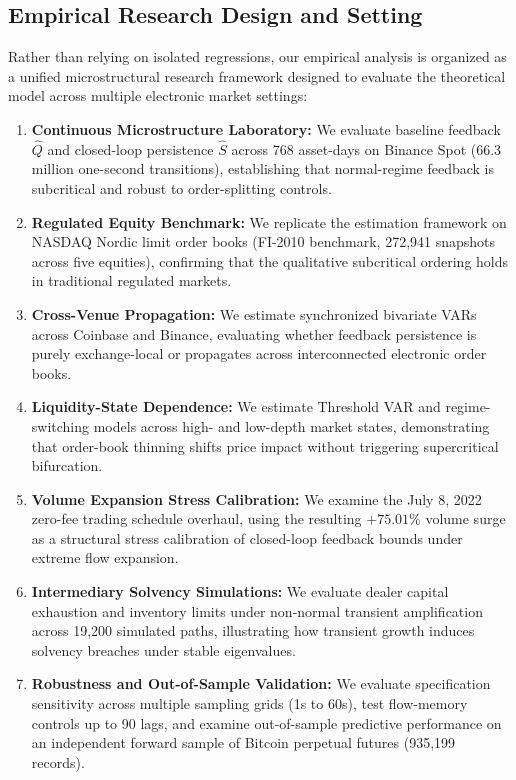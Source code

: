 \documentclass[12pt]{article}
\theoremstyle{definition}
\theoremstyle{remark}
\begin{document}
\subsection{Empirical Research Design and Setting}
Rather than relying on isolated regressions, our empirical analysis is organized as a unified microstructural research framework designed to evaluate the theoretical model across multiple electronic market settings:
\begin{enumerate}[label=\arabic*.]
    \item \textbf{Continuous Microstructure Laboratory:} We evaluate baseline feedback $\hat{Q}$ and closed-loop persistence $\hat{S}$ across 768 asset-days on Binance Spot (66.3 million one-second transitions), establishing that normal-regime feedback is subcritical and robust to order-splitting controls.
    \item \textbf{Regulated Equity Benchmark:} We replicate the estimation framework on NASDAQ Nordic limit order books (FI-2010 benchmark, 272,941 snapshots across five equities), confirming that the qualitative subcritical ordering holds in traditional regulated markets.
    \item \textbf{Cross-Venue Propagation:} We estimate synchronized bivariate VARs across Coinbase and Binance, evaluating whether feedback persistence is purely exchange-local or propagates across interconnected electronic order books.
    \item \textbf{Liquidity-State Dependence:} We estimate Threshold VAR and regime-switching models across high- and low-depth market states, demonstrating that order-book thinning shifts price impact without triggering supercritical bifurcation.
    \item \textbf{Volume Expansion Stress Calibration:} We examine the July 8, 2022 zero-fee trading schedule overhaul, using the resulting $+75.01\%$ volume surge as a structural stress calibration of closed-loop feedback bounds under extreme flow expansion.
    \item \textbf{Intermediary Solvency Simulations:} We evaluate dealer capital exhaustion and inventory limits under non-normal transient amplification across 19,200 simulated paths, illustrating how transient growth induces solvency breaches under stable eigenvalues.
    \item \textbf{Robustness and Out-of-Sample Validation:} We evaluate specification sensitivity across multiple sampling grids (1s to 60s), test flow-memory controls up to 90 lags, and examine out-of-sample predictive performance on an independent forward sample of Bitcoin perpetual futures (935,199 records).
\end{enumerate}
\end{document}
